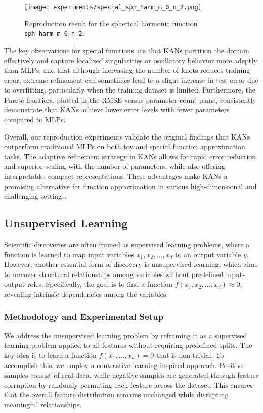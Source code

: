 \documentclass[conference]{IEEEtran}
\begin{document}
\begin{figure}[H]
    \centering
    \texttt{[image: experiments/special\_sph\_harm\_m\_0\_n\_2.png]}
    \caption{Reproduction result for the spherical harmonic function \texttt{sph\_harm\_m\_0\_n\_2}.}
    \label{fig:spherical_harm}
\end{figure}

The key observations for special functions are that KANs partition the domain
effectively and capture localized singularities or oscillatory behavior more
adeptly than MLPs, and that although increasing the number of knots reduces
training error, extreme refinement can sometimes lead to a slight increase in
test error due to overfitting, particularly when the training dataset is
limited. Furthermore, the Pareto frontiers, plotted in the RMSE versus
parameter count plane, consistently demonstrate that KANs achieve lower error
levels with fewer parameters compared to MLPs.

Overall, our reproduction experiments validate the original findings that KANs
outperform traditional MLPs on both toy and special function approximation
tasks. The adaptive refinement strategy in KANs allows for rapid error
reduction and superior scaling with the number of parameters, while also
offering interpretable, compact representations. These advantages make KANs a
promising alternative for function approximation in various high-dimensional
and challenging settings.

\subsection{Unsupervised Learning}

Scientific discoveries are often framed as supervised learning problems, where
a function is learned to map input variables $x_1, x_2, \dots, x_d$ to an
output variable $y$. However, another essential form of discovery is
unsupervised learning, which aims to uncover structural relationships among
variables without predefined input-output roles. Specifically, the goal is to
find a function $f(x_1, x_2, \dots, x_d) \approx 0$, revealing intrinsic
dependencies among the variables.

\subsubsection{Methodology and Experimental Setup}

We address the unsupervised learning problem by reframing it as a supervised
learning problem applied to all features without requiring predefined splits.
The key idea is to learn a function $f(x_1, \dots, x_d) = 0$ that is
non-trivial. To accomplish this, we employ a contrastive learning-inspired
approach. Positive samples consist of real data, while negative samples are
generated through feature corruption by randomly permuting each feature across
the dataset. This ensures that the overall feature distribution remains
unchanged while disrupting meaningful relationships.
\end{document}
